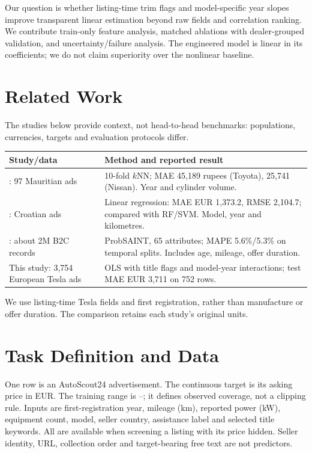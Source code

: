 Our question is whether listing-time trim flags and model-specific year slopes improve transparent linear estimation beyond raw fields and correlation ranking. We contribute train-only feature analysis, matched ablations with dealer-grouped validation, and uncertainty/failure analysis. The engineered model is linear in its coefficients; we do not claim superiority over the nonlinear baseline.

\section{Related Work}
The studies below provide context, not head-to-head benchmarks: populations, currencies, targets and evaluation protocols differ.
\begin{center}\small\setlength{\tabcolsep}{3pt}
\begin{tabularx}{\columnwidth}{@{}p{}X@{}}
\toprule Study/data & Method and reported result\\\midrule
\citet{pudaruth2014}: 97 Mauritian ads & 10-fold $k$NN; MAE 45,189 rupees (Toyota), 25,741 (Nissan). Year and cylinder volume.\\
\citet{bukvic2022}: Croatian ads & Linear regression: MAE EUR 1,373.2, RMSE 2,104.7; compared with RF/SVM. Model, year and kilometres.\\
\citet{madhusudhanan2024}: about 2M B2C records & ProbSAINT, 65 attributes; MAPE 5.6\%/5.3\% on temporal splits. Includes age, mileage, offer duration.\\
This study: 3,754 European Tesla ads & OLS with title flags and model-year interactions; test MAE EUR 3,711 on 752 rows.\\\bottomrule
\end{tabularx}\end{center}
We use listing-time Tesla fields and first registration, rather than manufacture or offer duration. The comparison retains each study's original units.

\section{Task Definition and Data}
One row is an AutoScout24 advertisement. The continuous target is its asking price in EUR. The training range is \eur\PriceMin{}--\PriceMax{}; it defines observed coverage, not a clipping rule. Inputs are first-registration year, mileage (km), reported power (kW), equipment count, model, seller country, assistance label and selected title keywords. All are available when screening a listing with its price hidden. Seller identity, URL, collection order and target-bearing free text are not predictors.

